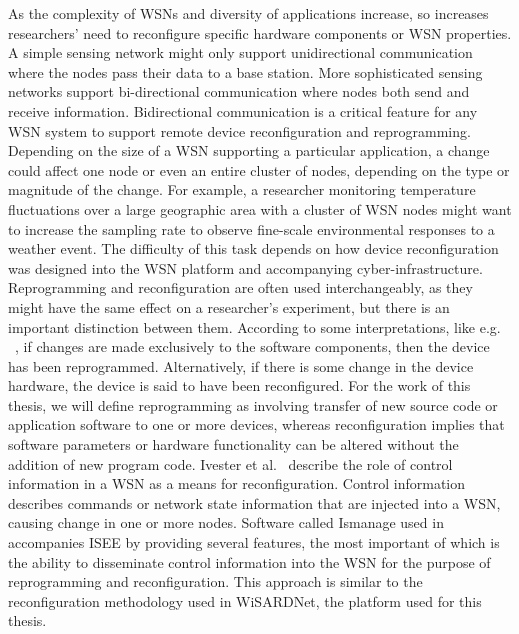 As the complexity of WSNs and diversity of applications increase, so increases researchers' need to reconfigure specific hardware components or WSN properties. A simple sensing network might only support unidirectional communication where the nodes pass their data to a base station. More sophisticated sensing networks support bi-directional communication where nodes both send and receive information. Bidirectional communication is a critical feature for any WSN system to support remote device reconfiguration and reprogramming. Depending on the size of a WSN supporting a particular application, a change could affect one node or even an entire cluster of nodes, depending on the type or magnitude of the change. For example, a researcher monitoring temperature fluctuations over a large geographic area with a cluster of WSN nodes might want to increase the sampling rate to observe fine-scale environmental responses to a weather event. The difficulty of this task depends on how device reconfiguration was designed into the WSN platform and accompanying cyber-infrastructure. \\

Reprogramming and reconfiguration are often used interchangeably, as they might have the same effect on a researcher's experiment, but there is an important distinction between them. According to some interpretations, like e.g. ~\cite{Eronu}, if changes are made exclusively to the software components, then the device has been reprogrammed. Alternatively, if there is some change in the device hardware, the device is said to have been reconfigured. For the work of this thesis, we will define  reprogramming as involving transfer of new source code or application software to one or more devices, whereas reconfiguration implies that software parameters or hardware functionality can be altered without the addition of new program code. Ivester et al.~\cite{Ivester} describe the role of control information in a WSN as a means for reconfiguration.  Control information describes commands or network state information that are injected into a WSN, causing change in one or more nodes. Software called Ismanage used in ~\cite{Ivester} accompanies ISEE by providing several features, the most important of which is the ability to disseminate control information into the WSN for the purpose of reprogramming and reconfiguration. This approach is similar to the reconfiguration methodology used in WiSARDNet, the platform used for this thesis.\\ 

